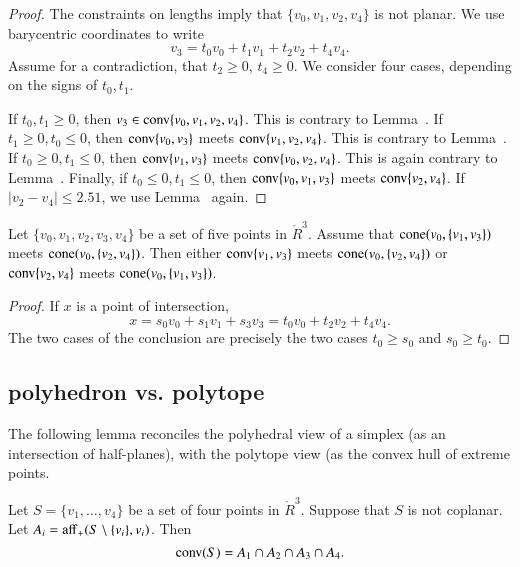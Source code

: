 \begin{proof}
The constraints on lengths imply that $\{v_0,v_1,v_2,v_4\}$
is not planar.  We use barycentric 
coordinates to write
  $$
  v_3 = t_0 v_0 + t_1 v_1 + t_2 v_2 + t_4 v_4.
  $$
Assume for a contradiction, that $t_2\ge0$, $t_4\ge0$.
We consider four cases, depending on the signs of $t_0,t_1$.

If $t_0,t_1\ge0$, then $v_3\in{\operatorname{conv}}\{v_0,v_1,v_2,v_4\}$.
This is contrary to Lemma~.
If $t_1\ge0,t_0\le0$, then ${\operatorname{conv}}\{v_0,v_3\}$ meets
${\operatorname{conv}}\{v_1,v_2,v_4\}$.  
This is contrary to Lemma~.
If $t_0\ge0,t_1\le0$, then ${\operatorname{conv}}\{v_1,v_3\}$ meets
${\operatorname{conv}}\{v_0,v_2,v_4\}$.  
This is again contrary to Lemma~.  Finally, if
$t_0\le0,t_1\le0$, then ${\operatorname{conv}}\{v_0,v_1,v_3\}$ meets 
${\operatorname{conv}}\{v_2,v_4\}$.  
If $|v_2-v_4|\le 2.51$, we use Lemma~ again.
\end{proof}

\newpage

\begin{lemma}
Let $\{v_0,v_1,v_2,v_3,v_4\}$ be a set of five points in $\ring{R}^3$.
Assume that ${\operatorname{cone}}(v_0,\{v_1,v_3\})$ meets
  ${\operatorname{cone}}(v_0,\{v_2,v_4\})$.  Then either
${\operatorname{conv}}\{v_1,v_3\}$ meets ${\operatorname{cone}}(v_0,\{v_2,v_4\})$ or
${\operatorname{conv}}\{v_2,v_4\}$ meets ${\operatorname{cone}}(v_0,\{v_1,v_3\})$.
\end{lemma}

\begin{proof} 
If $x$ is a point of intersection,
  $$
  x = s_0 v_0 + s_1 v_1 + s_3 v_ 3 = t_0 v_0 + t_2 v_2 + t_4 v_4.
  $$
The two cases of the conclusion are precisely the two cases
  $t_0\ge s_0$ and $s_0\ge t_0$.
\end{proof}

\newpage
\subsection{polyhedron vs. polytope}


The following lemma reconciles the polyhedral view of a simplex
(as an intersection of half-planes), with the polytope view (as
the convex hull of extreme points.

\begin{lemma} 
Let $S=\{v_1,\ldots, v_4\}$ be a set of four points
in $\ring{R}^3$.  Suppose that $S$ is not coplanar.
Let $A_i = {\operatorname{aff}}_+(S\setminus\{v_i\},v_i)$.
Then $${\operatorname{conv}}(S)  = A_1\cap A_2\cap A_3\cap A_4.$$
%
\end{lemma}


